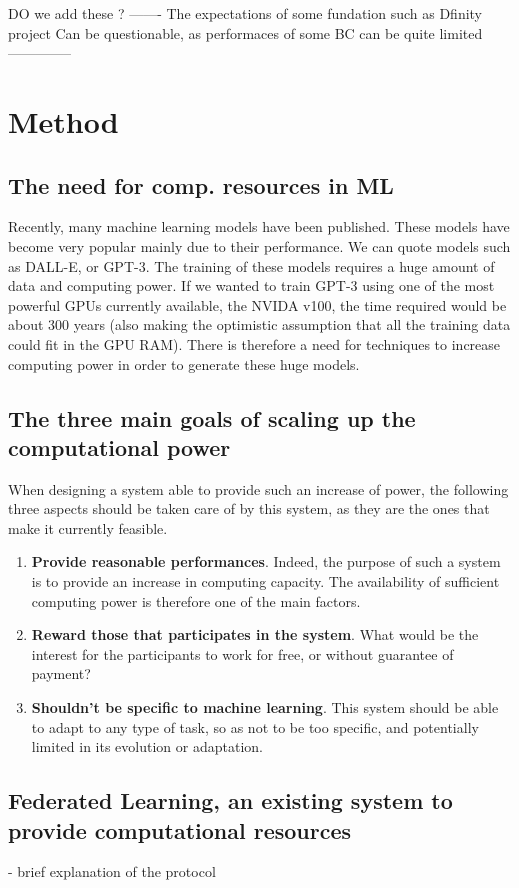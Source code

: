 \documentclass{article}
\begin{document}
DO we add these ? -------
The expectations of some fundation such as Dfinity project
Can be questionable, as performaces of some BC can be quite limited
--------------
\section{Method}
\subsection{The need for comp. resources in ML}
Recently, many machine learning models have been published. These models have become very popular mainly due to their
performance. We can quote models such as DALL-E, or GPT-3. The training of these models requires a huge amount of data
and computing power. If we wanted to train GPT-3 using one of the most powerful GPUs currently available,
the NVIDA v100, the time required would be about 300 years (also making the optimistic assumption that all the
training data could fit in the GPU RAM). There is therefore a need for techniques to increase computing power in order
to generate these huge models.
\subsection{The three main goals of scaling up the computational power}
When designing a system able to provide such an increase of power, the following three aspects should be taken care of
by this system, as they are the ones that make it currently feasible.
\begin{enumerate}
    \item \textbf{Provide reasonable performances}. Indeed, the purpose of such a system is to provide an increase in computing
     capacity. The availability of sufficient computing power is therefore one of the main factors.
    \item \textbf{Reward those that participates in the system}. What would be the interest for the participants to work for
     free, or without guarantee of payment?
    \item \textbf{Shouldn't be specific to machine learning}. This system should be able to adapt to any type of task, so as not
     to be too specific, and potentially limited in its evolution or adaptation.
\end{enumerate}

\subsection{Federated Learning, an existing system to provide computational resources}
- brief explanation of the protocol
\end{document}
